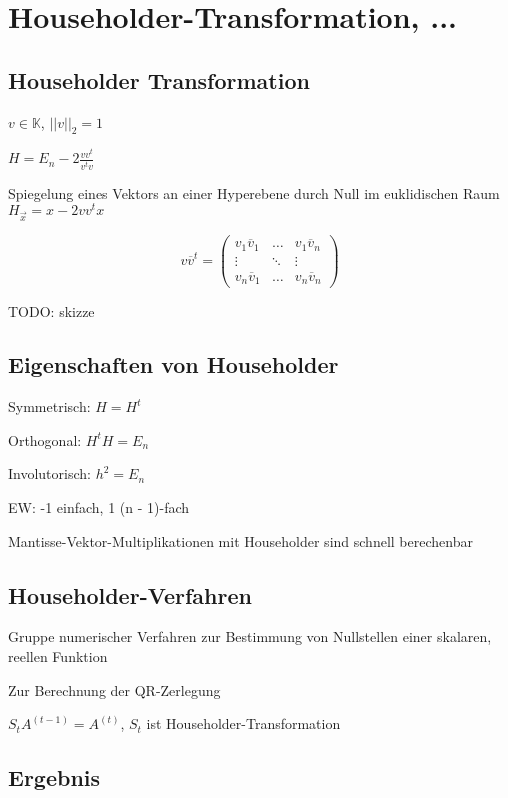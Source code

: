 \documentclass[12pt,a4paper]{article} %
\newcommand*\conj[1]{\overline{#1}}
\begin{document}
	\newpage
	
	\section{Householder-Transformation, ...}
	
	\subsection{Householder Transformation}
	
	$v \in \mathbb{K}$, $||v||_2 = 1$
	
	$H = E_n - 2 \frac{vv^t}{v^tv}$
	
	Spiegelung eines Vektors an einer Hyperebene durch Null im euklidischen Raum $H_{\overrightarrow{x}} = x - 2vv^tx$
	
	\begin{equation*}
		v\conj{v}^t =
		\begin{pmatrix}
			v_1\conj{v}_1 & \dotsc & v_1\conj{v}_n \\
			\vdots & \ddots & \vdots \\
			v_n\conj{v}_1 & \dotsc & v_n\conj{v}_n
		\end{pmatrix}
	\end{equation*}
	
	TODO: skizze
	
	\subsection{Eigenschaften von Householder}
	
	Symmetrisch: $H = H^t$
	
	Orthogonal: $H^tH = E_n$
	
	Involutorisch: $h^2 = E_n$
	
	EW: -1 einfach, 1 (n - 1)-fach
	
	Mantisse-Vektor-Multiplikationen mit Householder sind schnell berechenbar
	
	\subsection{Householder-Verfahren}
	
	Gruppe numerischer Verfahren zur Bestimmung von Nullstellen einer skalaren, reellen Funktion
	
	Zur Berechnung der QR-Zerlegung
	
	$S_tA^{(t - 1)} = A^{(t)}$, $S_t$ ist Householder-Transformation
	
	\subsection{Ergebnis}
	
\end{document}
